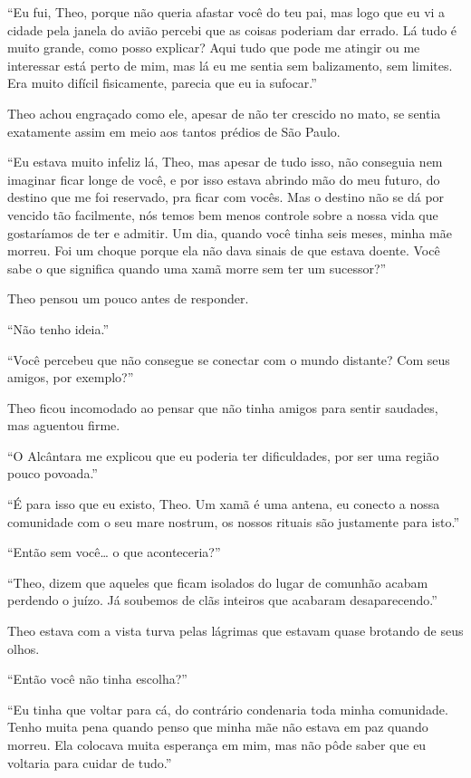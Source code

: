``Eu fui, Theo, porque não queria afastar você do teu pai, mas logo que
eu vi a cidade pela janela do avião percebi que as coisas poderiam dar
errado. Lá tudo é muito grande, como posso explicar? Aqui tudo que pode
me atingir ou me interessar está perto de mim, mas lá eu me sentia sem
balizamento, sem limites. Era muito difícil fisicamente, parecia que eu
ia sufocar.''

Theo achou engraçado como ele, apesar de não ter crescido no mato, se
sentia exatamente assim em meio aos tantos prédios de São Paulo.

``Eu estava muito infeliz lá, Theo, mas apesar de tudo isso, não
conseguia nem imaginar ficar longe de você, e por isso estava abrindo mão
do meu futuro, do destino que me foi reservado, pra ficar com vocês. Mas
o destino não se dá por vencido tão facilmente, nós temos bem menos
controle sobre a nossa vida que gostaríamos de ter e admitir. Um dia,
quando você tinha seis meses, minha mãe morreu. Foi um choque porque ela
não dava sinais de que estava doente. Você sabe o que significa quando
uma xamã morre sem ter um sucessor?''

Theo pensou um pouco antes de responder.

``Não tenho ideia.''

``Você percebeu que não consegue se conectar com o mundo distante? Com
seus amigos, por exemplo?''

Theo ficou incomodado ao pensar que não tinha amigos para sentir
saudades, mas aguentou firme.

``O Alcântara me explicou que eu poderia ter dificuldades, por ser uma
região pouco povoada.''

``É para isso que eu existo, Theo. Um xamã é uma antena, eu conecto a
nossa comunidade com o seu mare nostrum, os nossos rituais são
justamente para isto.''

``Então sem você\ldots{} o que aconteceria?''

``Theo, dizem que aqueles que ficam isolados do lugar de comunhão acabam
perdendo o juízo. Já soubemos de clãs inteiros que acabaram
desaparecendo.''

Theo estava com a vista turva pelas lágrimas que estavam quase brotando
de seus olhos.

``Então você não tinha escolha?''

``Eu tinha que voltar para cá, do contrário condenaria toda minha
comunidade. Tenho muita pena quando penso que minha mãe não estava em
paz quando morreu. Ela colocava muita esperança em mim, mas não pôde
saber que eu voltaria para cuidar de tudo.''

